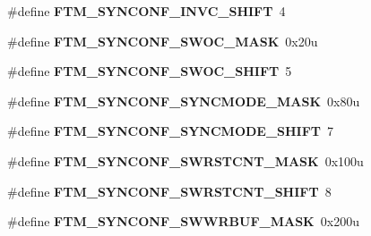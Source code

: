\begin{DoxyCompactItemize}
\item 
\hypertarget{group___f_t_m___register___masks_ga3cd40ba39f488383a2fb0f456182fd69}{}\#define {\bfseries F\+T\+M\+\_\+\+S\+Y\+N\+C\+O\+N\+F\+\_\+\+I\+N\+V\+C\+\_\+\+S\+H\+I\+F\+T}~4\label{group___f_t_m___register___masks_ga3cd40ba39f488383a2fb0f456182fd69}

\item 
\hypertarget{group___f_t_m___register___masks_ga4be17e62a2b566e56f1fb8e1b6277637}{}\#define {\bfseries F\+T\+M\+\_\+\+S\+Y\+N\+C\+O\+N\+F\+\_\+\+S\+W\+O\+C\+\_\+\+M\+A\+S\+K}~0x20u\label{group___f_t_m___register___masks_ga4be17e62a2b566e56f1fb8e1b6277637}

\item 
\hypertarget{group___f_t_m___register___masks_ga526c746783f0693a0a3ceb20e439ca26}{}\#define {\bfseries F\+T\+M\+\_\+\+S\+Y\+N\+C\+O\+N\+F\+\_\+\+S\+W\+O\+C\+\_\+\+S\+H\+I\+F\+T}~5\label{group___f_t_m___register___masks_ga526c746783f0693a0a3ceb20e439ca26}

\item 
\hypertarget{group___f_t_m___register___masks_ga89a0f9556ea7950d3e283bebb64ab41a}{}\#define {\bfseries F\+T\+M\+\_\+\+S\+Y\+N\+C\+O\+N\+F\+\_\+\+S\+Y\+N\+C\+M\+O\+D\+E\+\_\+\+M\+A\+S\+K}~0x80u\label{group___f_t_m___register___masks_ga89a0f9556ea7950d3e283bebb64ab41a}

\item 
\hypertarget{group___f_t_m___register___masks_gaa8a4896f4e71a168309874a5523cadfc}{}\#define {\bfseries F\+T\+M\+\_\+\+S\+Y\+N\+C\+O\+N\+F\+\_\+\+S\+Y\+N\+C\+M\+O\+D\+E\+\_\+\+S\+H\+I\+F\+T}~7\label{group___f_t_m___register___masks_gaa8a4896f4e71a168309874a5523cadfc}

\item 
\hypertarget{group___f_t_m___register___masks_gaca64a162094a826217a4e11ddc06a818}{}\#define {\bfseries F\+T\+M\+\_\+\+S\+Y\+N\+C\+O\+N\+F\+\_\+\+S\+W\+R\+S\+T\+C\+N\+T\+\_\+\+M\+A\+S\+K}~0x100u\label{group___f_t_m___register___masks_gaca64a162094a826217a4e11ddc06a818}

\item 
\hypertarget{group___f_t_m___register___masks_gab661d595985aee2b904c0aeae79125c0}{}\#define {\bfseries F\+T\+M\+\_\+\+S\+Y\+N\+C\+O\+N\+F\+\_\+\+S\+W\+R\+S\+T\+C\+N\+T\+\_\+\+S\+H\+I\+F\+T}~8\label{group___f_t_m___register___masks_gab661d595985aee2b904c0aeae79125c0}

\item 
\hypertarget{group___f_t_m___register___masks_ga36811ec448ab628c5157dabf3c62381e}{}\#define {\bfseries F\+T\+M\+\_\+\+S\+Y\+N\+C\+O\+N\+F\+\_\+\+S\+W\+W\+R\+B\+U\+F\+\_\+\+M\+A\+S\+K}~0x200u\label{group___f_t_m___register___masks_ga36811ec448ab628c5157dabf3c62381e}


\end{DoxyCompactItemize}
